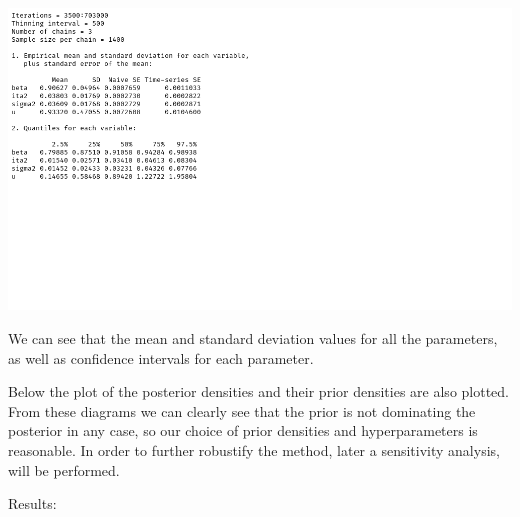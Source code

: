 \documentclass[12pt,a4paper]{article}
\begin{document}
\begin{enumerate}[(a)]
\includegraphics[scale=0.25]{./images/1_Table0.png}

We can see that the mean and standard deviation values for all the parameters, as well as confidence intervals for each parameter.

Below the plot of the posterior densities and their prior densities are also plotted. From these diagrams we can clearly see that the prior is not dominating the posterior in any case, so our choice of prior densities and hyperparameters is reasonable. In order to further robustify the method, later a sensitivity analysis, will be performed.

Results:


\end{enumerate}
\end{document}

